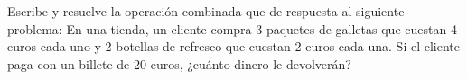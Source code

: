 \documentclass{exam}
\begin{document}
\begin{questions}
\begin{parts}
    \vspace{20pt}    \vspace{20pt}
    \vspace{20pt}    \vspace{20pt}

\end{parts}

\question Escribe y resuelve la operación combinada que de respuesta al siguiente problema: En una tienda, un cliente compra 3 paquetes de galletas que cuestan 4 euros cada uno y 2 botellas de refresco que cuestan 2 euros cada una. Si el cliente paga con un billete de 20 euros, ¿cuánto dinero le devolverán?

\end{questions}
\end{document}
